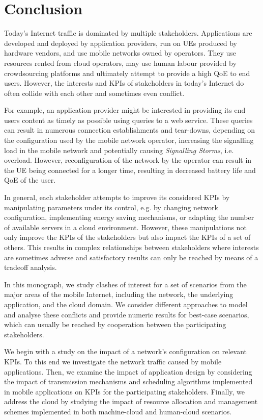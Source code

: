 \chapter{Conclusion}\label{chap:conclusion}

Today's Internet traffic is dominated by multiple stakeholders.
Applications are developed and deployed by application providers, run on \glspl{UE} produced by hardware vendors, and use mobile networks owned by operators.
They use resources rented from cloud operators, may use human labour provided by crowdsourcing platforms and ultimately attempt to provide a high \gls{QoE} to end users.
However, the interests and \glspl{KPI} of stakeholders in today's Internet do often collide with each other and sometimes even conflict.

For example, an application provider might be interested in providing its end users content as timely as possible using queries to a web service.
These queries can result in numerous connection establishments and tear-downs, depending on the configuration used by the mobile network operator, increasing the signalling load in the mobile network and potentially causing \emph{Signalling Storms}, i.e. overload.
However, reconfiguration of the network by the operator can result in the \gls{UE} being connected for a longer time, resulting in decreased battery life and \gls{QoE} of the user.  

In general, each stakeholder attempts to improve its considered \glspl{KPI} by manipulating parameters under its control, e.g. by changing network configuration, implementing energy saving mechanisms, or adapting the number of available servers in a cloud environment.
However, these manipulations not only improve the \glspl{KPI} of the stakeholders but also impact the \glspl{KPI} of a set of others.
This results in complex relationships between stakeholders where interests are sometimes adverse and satisfactory results can only be reached by means of a tradeoff analysis.

In this monograph, we study clashes of interest for a set of scenarios from the major areas of the mobile Internet, including the network, the underlying application, and the cloud domain.
We consider different approaches to model and analyse these conflicts and provide numeric results for best-case scenarios, which can usually be reached by cooperation between the participating stakeholders.

We begin with a study on the impact of a network's configuration on relevant \glspl{KPI}.
To this end we investigate the network traffic caused by mobile applications.
Then, we examine the impact of application design by considering the impact of transmission mechanisms and scheduling algorithms implemented in mobile applications on \glspl{KPI} for the participating stakeholders.
Finally, we address the cloud by studying the impact of resource allocation and management schemes implemented in both machine-cloud and human-cloud scenarios.

